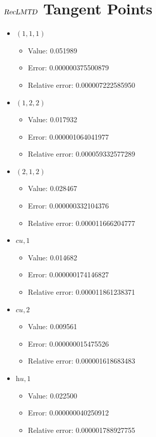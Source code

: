 \documentclass{article}%
\begin{document}
\section{$\textsl{RecLMTD}$ Tangent Points}%
\thispagestyle{plain}%
\begin{itemize}%
	\item $(1, 1, 1)$%
	\begin{itemize}%
		\item Value: 0.051989%
		\item Error: 0.000000375500879%
		\item Relative error: 0.000007222585950%
	\end{itemize}%
	\item $(1, 2, 2)$%
	\begin{itemize}%
		\item Value: 0.017932%
		\item Error: 0.000001064041977%
		\item Relative error: 0.000059332577289%
	\end{itemize}%
	\item $(2, 1, 2)$%
	\begin{itemize}%
		\item Value: 0.028467%
		\item Error: 0.000000332104376%
		\item Relative error: 0.000011666204777%
	\end{itemize}%
	\item $\textit{cu},1$%
	\begin{itemize}%
		\item Value: 0.014682%
		\item Error: 0.000000174146827%
		\item Relative error: 0.000011861238371%
	\end{itemize}%
	\item $\textit{cu},2$%
	\begin{itemize}%
		\item Value: 0.009561%
		\item Error: 0.000000015475526%
		\item Relative error: 0.000001618683483%
	\end{itemize}%
	\item $\textit{hu},1$%
	\begin{itemize}%
		\item Value: 0.022500%
		\item Error: 0.000000040250912%
		\item Relative error: 0.000001788927755%
	\end{itemize}%
\end{itemize}%
\end{document}
